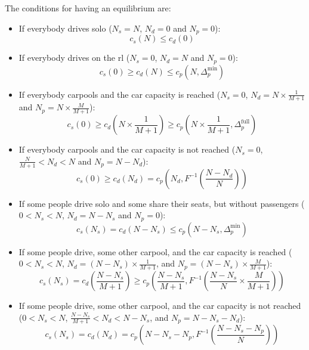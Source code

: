 \documentclass[english, a4paper]{article}
\theoremstyle{plain}
\theoremstyle{definition}
\theoremstyle{remark}
\begin{document}
The conditions for having an equilibrium are:
\begin{itemize}
    \item If everybody drives solo ($N_s = N$, $N_d = 0$ and $N_p = 0$):
        \begin{equation}
            \label{eq_equilibrium_cond_start}
            c_s(N) \leq c_d (0)
        \end{equation}
    
    \item If everybody drives on the \acrshort{rl} ($N_s = 0$, $N_d = N$ and $N_p = 0$):
        \begin{equation}
            c_s(0) \geq c_d (N) \leq c_p(N, \Delta _p^{\text{min}})
        \end{equation}

    \item If everybody carpools and the car capacity is reached ($N_s = 0$, $N_d = N\times \frac{1}{M+1}$ and $N_p = N\times \frac{M}{M+1}$):
        \begin{equation}
            c_s(0) \geq c_d (N\times \frac{1}{M+1}) \geq c_p(N\times \frac{1}{M+1}, \Delta _p^{\text{full}})
        \end{equation}

        
    \item If everybody carpools and the car capacity is not reached ($N_s = 0$, $\frac{N}{M+1} < N_d < N$ and $N_p = N - N_d$):
        \begin{equation}
            c_s(0) \geq c_d (N_d) = c_p\left(N_d, F^{-1} \left( \frac{N - N_d}{N} \right)\right)
        \end{equation}

    \item If some people drive solo and some share their seats, but without passengers ($0 < N_s < N$, $N_d = N - N_s$ and $N_p = 0$):
        \begin{equation}
            c_s(N_s) = c_d (N - N_s) \leq c_p(N - N_s, \Delta _p^{\text{min}})
        \end{equation}

    \item If some people drive, some other carpool, and the car capacity is reached ($0 < N_s < N$, $N_d = (N-N_s)\times \frac{1}{M+1}$, and $N_p = (N-N_s)\times \frac{M}{M+1}$):
        \begin{equation}
            c_s(N_s) =  c_d \left( \frac{N-N_s}{M+1} \right) \geq c_p \left( \frac{N-N_s}{M+1}, F^{-1} \left( \frac{N-N_s}{N}\times \frac{M}{M+1} \right) \right)
        \end{equation}

    \item If some people drive, some other carpool, and the car capacity is not reached ($0 < N_s < N$, $\frac{N - N_s}{M+1} < N_d < N - N_s$, and $N_p = N - N_s - N_d$):
        \begin{equation}
            \label{eq_equilibrium_cond_finish}
            c_s(N_s) = c_d ( N_d ) = c_p\left(N - N_s - N_p, F^{-1}\left( \frac{N - N_s - N_p}{N} \right) \right)
        \end{equation}
\end{itemize}
\end{document}
